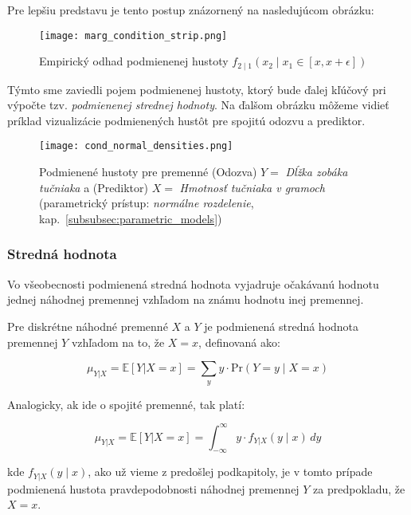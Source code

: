 Pre lepšiu predstavu je tento postup znázornený na nasledujúcom obrázku:

\begin{figure}[H]
    \centering
    \texttt{[image: marg\_condition\_strip.png]}
    \caption{Empirický odhad podmienenej hustoty $f_{2 \mid 1}(x_2 \mid x_1 \in [x, x + \epsilon])$}
    \label{fig:cond_density_strip}
\end{figure}

Týmto sme zaviedli pojem podmienenej hustoty, ktorý bude ďalej kľúčový pri výpočte tzv. \textit{podmienenej strednej hodnoty}. Na ďalšom obrázku môžeme vidieť príklad vizualizácie podmienených hustôt pre spojitú odozvu a prediktor.

\begin{figure}[H]
    \centering
    \texttt{[image: cond\_normal\_densities.png]}
    \caption{Podmienené hustoty pre premenné (Odozva) $Y=$ \textit{Dĺžka zobáka tučniaka} a (Prediktor) $X=$ \textit{Hmotnosť tučniaka v gramoch} (parametrický prístup: \textit{normálne rozdelenie}, kap.~\ref{subsubsec:parametric_models})}
    \label{fig:cond_normal_densities}
\end{figure}

\subsubsection{Stredná hodnota}\label{subsubsec:conditional_mean}

Vo všeobecnosti podmienená stredná hodnota vyjadruje očakávanú hodnotu jednej náhodnej premennej vzhľadom na známu hodnotu inej premennej.

Pre diskrétne náhodné premenné $X$ a $Y$ je podmienená stredná hodnota premennej $Y$ vzhľadom na to, že $X = x$, definovaná ako:

\begin{equation}
\mu_{Y|X} = \mathbb{E}[Y|X = x] = \sum_{y} y \cdot \mathrm{Pr}(Y = y \mid X = x)
\end{equation}

Analogicky, ak ide o spojité premenné, tak platí:

\begin{equation}
\mu_{Y|X} = \mathbb{E}[Y|X = x] = \int_{-\infty}^{\infty} y \cdot f_{Y|X}(y \mid x) \, dy
\end{equation}

kde $f_{Y|X}(y \mid x)$, ako už vieme z predošlej podkapitoly, je v tomto prípade podmienená hustota pravdepodobnosti náhodnej premennej $Y$ za predpokladu, že $X = x$.

